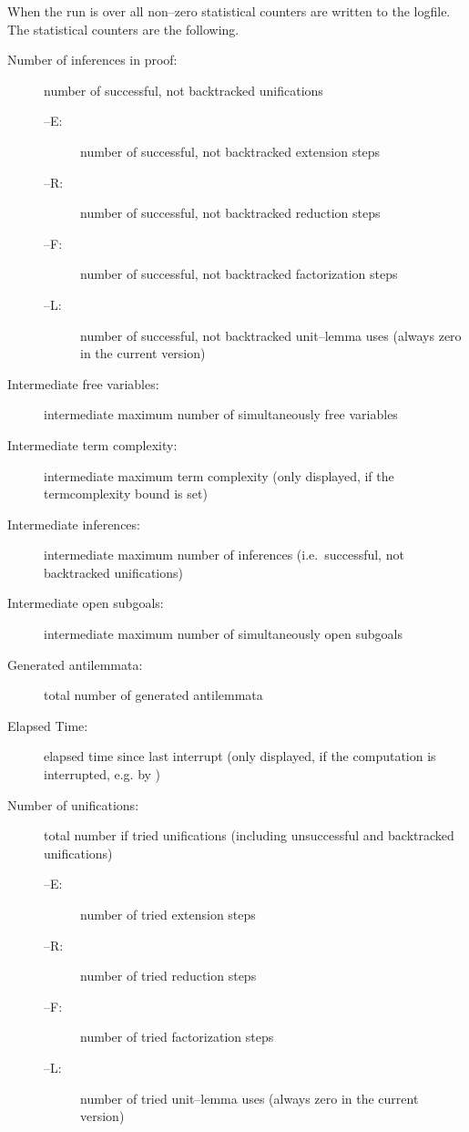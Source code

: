 When the run is over all non--zero statistical counters are written to
the logfile. The statistical counters are the following. 
\begin{description}

\item[Number of inferences in proof:]
     number of successful, not backtracked unifications
     \begin{description}
     \item [--E:] number of successful, not backtracked extension steps
     \item [--R:] number of successful, not backtracked reduction steps
     \item [--F:] number of successful, not backtracked factorization
                  steps 
     \item [--L:] number of successful, not backtracked unit--lemma
                  uses (always zero in the current version) 
     \end{description}
     
\item[Intermediate free variables:]
     intermediate maximum number of simultaneously free variables
     
\item[Intermediate term complexity:]
     intermediate maximum term complexity (only displayed, if the
     termcomplexity bound is set) 
     
\item[Intermediate inferences:]
     intermediate maximum number of inferences (i.e.\ successful, not
     backtracked unifications) 
     
\item[Intermediate open subgoals:]
     intermediate maximum number of simultaneously open subgoals
     
\item[Generated antilemmata:]
     total number of generated antilemmata
     
\item[Elapsed Time:]
     elapsed time since last interrupt (only displayed, if the
     computation is interrupted, e.g. by \Cc)
     
\item[Number of unifications:]
     total number if tried unifications (including unsuccessful and
     backtracked unifications)
     \begin{description}
     \item [--E:] number of tried extension steps
     \item [--R:] number of tried reduction steps
     \item [--F:] number of tried factorization steps
     \item [--L:] number of tried unit--lemma uses (always zero in the 
                  current version) 
     \end{description}
     

\end{description}
